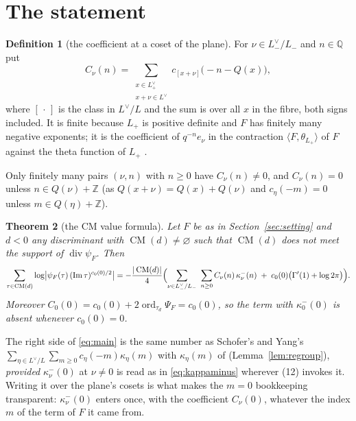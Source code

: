 \documentclass[11pt,reqno]{amsart}
\theoremstyle{plain}
\newtheorem{theorem}{Theorem}[section]
\theoremstyle{definition}
\newtheorem{definition}[theorem]{Definition}
\DeclareMathOperator{\ord}{ord}
\DeclareMathOperator{\CM}{CM}
\newcommand{\Q}{\mathbb{Q}}
\newcommand{\Z}{\mathbb{Z}}
\newcommand{\Ldual}{L^{\vee}}
\newcommand{\Lm}{L_{-}}
\newcommand{\Lp}{L_{+}}
\begin{document}
\section{The statement}\label{sec:statement}

\begin{definition}[the coefficient at a coset of the plane]\label{def:C}
For $\nu\in\Lm^\vee/\Lm$ and $n\in\Q$ put
\[
  C_\nu(n)=\sum_{\substack{x\in\Lp^\vee\\ x+\nu\in\Ldual}}c_{[x+\nu]}\bigl(-n-Q(x)\bigr),
\]
where $[\,\cdot\,]$ is the class in $\Ldual/L$ and the sum is over all $x$ in the fibre, both signs
included. It is finite because $\Lp$ is positive definite and $F$ has finitely many negative
exponents; it is the coefficient of $q^{-n}e_\nu$ in the contraction $\langle F,\theta_{\Lp}\rangle$
of $F$ against the theta function of $\Lp$ \cite[Cor.~3.2]{Schofer}.
\end{definition}

Only finitely many pairs $(\nu,n)$ with $n\ge0$ have $C_\nu(n)\neq0$, and $C_\nu(n)=0$ unless
$n\in Q(\nu)+\Z$ (as $Q(x+\nu)=Q(x)+Q(\nu)$ and $c_\eta(-m)=0$ unless $m\in Q(\eta)+\Z$).

\begin{theorem}[the CM value formula]\label{thm:main}
Let $F$ be as in Section~\ref{sec:setting} and $d<0$ any discriminant with $\CM(d)\ne\varnothing$
such that $\CM(d)$ does not meet the support of $\operatorname{div}\psi_F$. Then
\begin{equation}\label{eq:main}
  \sum_{\tau\in\CM(d)}\log\bigl|\psi_F(\tau)\,(\operatorname{Im}\tau)^{c_0(0)/2}\bigr|
  =-\frac{|\CM(d)|}{4}\Bigl(\sum_{\nu\in\Lm^\vee/\Lm}\ \sum_{n\ge0}C_\nu(n)\,\kappa^-_\nu(n)
     \;+\;c_0(0)\bigl(\Gamma'(1)+\log2\pi\bigr)\Bigr).
\end{equation}
Moreover $C_0(0)=c_0(0)+2\ord_{\tau_d}\Psi_F=c_0(0)$, so the term with $\kappa^-_0(0)$ is absent
whenever $c_0(0)=0$.
\end{theorem}

The right side of \eqref{eq:main} is the same number as Schofer's and Yang's
$\sum_{\eta\in\Ldual/L}\sum_{m\ge0}c_\eta(-m)\kappa_\eta(m)$ with $\kappa_\eta(m)$ of
\cite[(12)]{Yang} (Lemma~\ref{lem:regroup}), \emph{provided} $\kappa^-_\nu(0)$ at $\nu\neq0$ is
read as in \eqref{eq:kappaminus} wherever (12) invokes it. Writing it over the plane's cosets is
what makes the $m=0$ bookkeeping transparent: $\kappa^-_\nu(0)$ enters once, with the coefficient
$C_\nu(0)$, whatever the index $m$ of the term of $F$ it came from.
\end{document}
